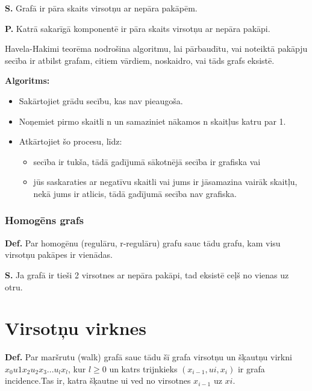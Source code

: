 \documentclass{article}
\begin{document}
\textbf{S. } Grafā ir pāra skaits virsotņu ar nepāra pakāpēm. 

\textbf{P. } Katrā sakarīgā komponentē ir pāra skaits virsotņu ar nepāra pakāpi.

Havela-Hakimi teorēma nodrošina algoritmu, lai pārbaudītu, vai noteiktā pakāpju secība ir atbilst grafam, citiem vārdiem, noskaidro, vai tāds grafs eksistē. 

\textbf{Algoritms:}
\begin{itemize}
	\item Sakārtojiet grādu secību, kas nav pieaugoša.  \item Noņemiet pirmo skaitli n un samaziniet nākamos n skaitļus katru par 1.
	\item Atkārtojiet šo procesu, līdz:
	\begin{itemize}
		\item secība ir tukša, tādā gadījumā sākotnējā secība ir grafiska vai
		\item jūs saskaraties ar negatīvu skaitli vai jums ir jāsamazina vairāk skaitļu, nekā jums ir atlicis, tādā gadījumā secība nav grafiska.
	\end{itemize}
\end{itemize}

\subsubsection{Homogēns grafs}


\textbf{Def.} Par homogēnu (regulāru, r-regulāru) grafu sauc tādu grafu, kam visu virsotņu pakāpes ir vienādas.

\textbf{S. } Ja grafā ir tieši 2 virsotnes ar nepāra pakāpi, tad eksistē ceļš no vienas uz
otru.



\section{Virsotņu virknes}

\textbf{Def.}  Par maršrutu (walk) grafā sauc tādu šī grafa virsotņu un šķautņu virkni $x_0 u1 x_2 u_2 x_3 ...u_l x_l $, kur $l \ge 0$ un katrs trijnkieks $(x_{i−1} , ui , x_i )$ ir grafa incidence.Tas ir, katra šķautne ui ved no virsotnes $x_{i −1}$ uz $xi $.
\end{document}
